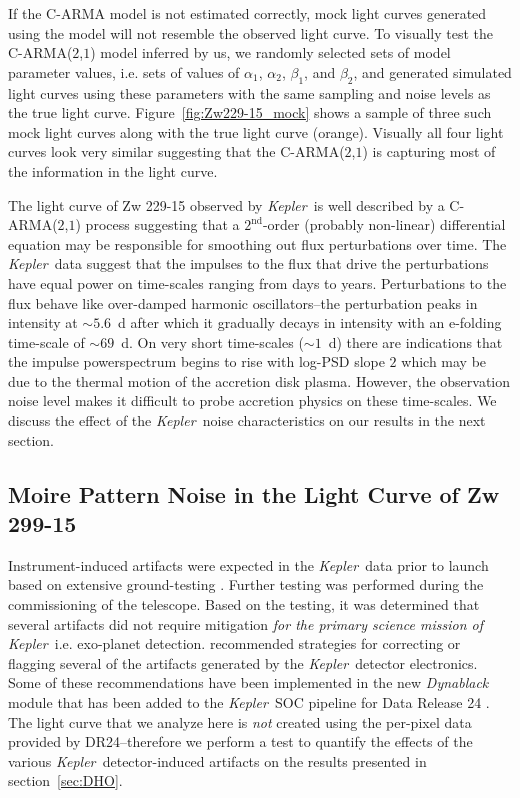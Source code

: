 \documentclass[a4paper,fleqn,usenatbib]{mnras}
\newcommand{\Kepler}{\textit{Kepler~}}
\begin{document}
If the C-ARMA model is not estimated correctly, mock light curves generated using the model will not resemble the observed light curve. To visually test the C-ARMA($2$,$1$) model inferred by us, we randomly selected sets of model parameter values, i.e. sets of values of $\alpha_{1}$, $\alpha_{2}$, $\beta_{1}$, and $\beta_{2}$, and generated simulated light curves using these parameters with the same sampling and noise levels as the true light curve. Figure~\ref{fig:Zw229-15_mock} shows a sample of three such mock light curves along with the true light curve (orange). Visually all four light curves look very similar suggesting that the C-ARMA($2$,$1$) is capturing most of the information in the light curve. 

The light curve of Zw 229-15 observed by \Kepler is well described by a C-ARMA($2$,$1$) process suggesting that a $2^{\mathrm{nd}}$-order (probably non-linear) differential equation may be responsible for smoothing out flux perturbations over time. The \Kepler data suggest that the impulses to the flux that drive the perturbations have equal power on time-scales ranging from days to years. Perturbations to the flux behave like over-damped harmonic oscillators--the perturbation peaks in intensity at $\sim 5.6$~d after which it gradually decays in intensity with an $\mathrm{e}$-folding time-scale of $\sim 69$~d. On very short time-scales ($\sim 1$~d) there are indications that the impulse powerspectrum begins to rise with log-PSD slope $2$ which may be due to the thermal motion of the accretion disk plasma. However, the observation noise level makes it difficult to probe accretion physics on these time-scales. We discuss the effect of the \Kepler noise characteristics on our results in the next section.

\subsection[Moire Pattern Noise]{Moire Pattern Noise in the Light Curve of Zw 299-15}\label{sec:MPD}

Instrument-induced artifacts were expected in the \Kepler data prior to launch based on extensive ground-testing \citep{Kol10}. Further testing was performed during the commissioning of the telescope. Based on the testing, it was determined that several artifacts did not require mitigation \textit{for the primary science mission of} \Kepler i.e. exo-planet detection. \citet{Kol10} recommended strategies for correcting or flagging several of the artifacts generated by the \Kepler detector electronics. Some of these recommendations have been implemented in the new \textit{Dynablack} module \citep{Clarke14} that has been added to the \Kepler SOC pipeline for Data Release 24 \citep{DR24}. The light curve that we analyze here is \textit{not} created using the per-pixel data provided by DR24--therefore we perform a test to quantify the effects of the various \Kepler detector-induced artifacts on the results presented in section~\ref{sec:DHO}. 
\end{document}
